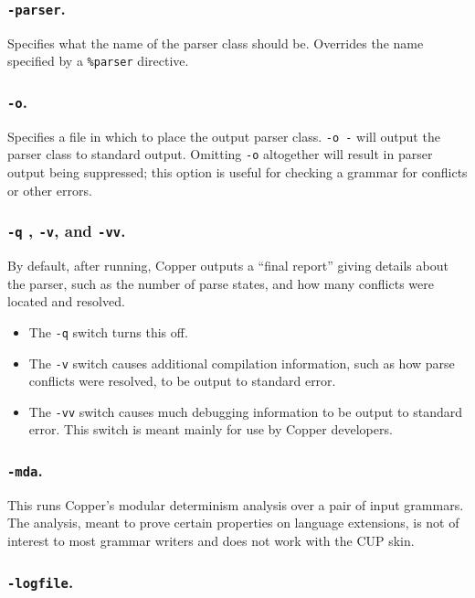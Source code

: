 \documentclass[12pt,english,twoside]{report}
\begin{document}
\subsubsection{\texttt{-parser}.}

Specifies what the name of the parser class should be. Overrides the
name specified by a \texttt{\%parser} directive.

\subsubsection{\texttt{-o}.}

Specifies a file in which to place the output parser class. \texttt{-o
  -} will output the parser class to standard output. Omitting
\texttt{-o} altogether will result in parser output being suppressed;
this option is useful for checking a grammar for conflicts or other
errors.

\subsubsection{\texttt{-q} , \texttt{-v}, and \texttt{-vv}.}

By default, after running, Copper outputs a {}``final report'' giving
details about the parser, such as the number of parse states, and
how many conflicts were located and resolved.

\begin{itemize}
\item The \texttt{-q} switch turns this off.
\item The \texttt{-v} switch causes additional compilation information,
such as how parse conflicts were resolved, to be output to standard
error.
\item The \texttt{-vv} switch causes much debugging information to be output
to standard error. This switch is meant mainly for use by Copper developers.
\end{itemize}

\subsubsection{\texttt{-mda}.}

This runs Copper's modular determinism analysis over a pair of input
grammars. The analysis, meant to prove certain properties on language
extensions, is not of interest to most grammar writers and does not
work with the CUP skin.

\subsubsection{\texttt{-logfile}.}
\end{document}
